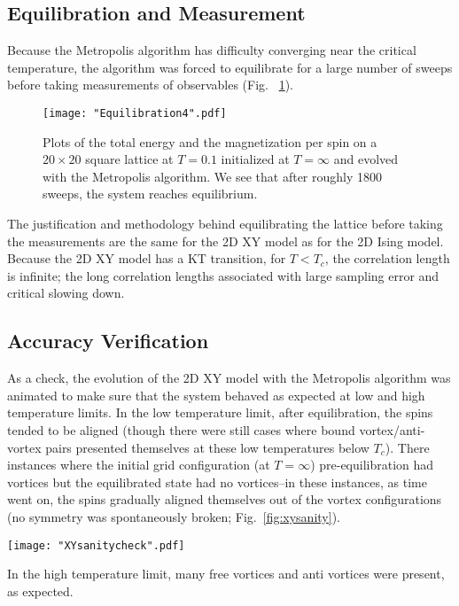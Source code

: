 \documentclass[twocolumn,aps]{revtex4-1} %
\begin{document}
\subsection{Equilibration and Measurement}

Because the Metropolis algorithm has difficulty converging near the critical temperature, the algorithm was forced to equilibrate for a large number of sweeps before taking measurements of observables (Fig.~ \ref{fig:xyequilb}).
\begin{figure}
	\texttt{[image: "Equilibration4".pdf]}
	\caption{\label{fig:xyequilb} Plots of the total energy and the magnetization per spin on a $20 \times 20$ square lattice at $T = 0.1$ initialized at $T = \infty$ and evolved with the Metropolis algorithm. We see that after roughly 1800 sweeps, the system reaches equilibrium.}
\end{figure}
The justification and methodology behind equilibrating the lattice before taking the measurements are the same for the 2D XY model as for the 2D Ising model. Because the 2D XY model has a KT transition, for $T < T_c$, the correlation length is infinite; the long correlation lengths associated with large sampling error and critical slowing down.

\subsection{Accuracy Verification}

As a check, the evolution of the 2D XY model with the Metropolis algorithm was animated to make sure that the system behaved as expected at low and high temperature limits. In the low temperature limit, after equilibration, the spins tended to be aligned (though there were still cases where bound vortex/anti-vortex pairs presented themselves at these low temperatures below $T_c$). There instances where the initial grid configuration (at $T = \infty$) pre-equilibration had vortices but the equilibrated state had no vortices--in these instances, as time went on, the spins gradually aligned themselves out of the vortex configurations (no symmetry was spontaneously broken; Fig.~\ref{fig:xysanity}). 
\begin{figure*}
	\texttt{[image: "XYsanitycheck".pdf]}
	\caption{\label{fig:xysanity} Plots of the grid configuration on a $20 \times 20$ square lattice at $T = 0.1$ initialized at $T = \infty$ and evolved with the Metropolis algorithm. We see that as the system reaches equilibrium, the free vortices go away and the spins align in a quasi-ordered state.}
\end{figure*}
In the high temperature limit, many free vortices and anti vortices were present, as expected. 
\end{document}
